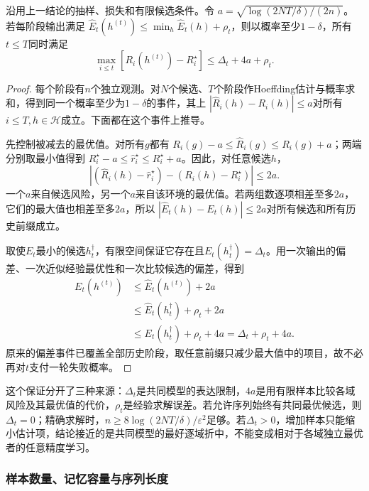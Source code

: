 \begin{theorem}[有限候选的逐历史分布保证]
\label{thm:continual-uniform-finite}
沿用上一结论的抽样、损失和有限候选条件。令
$a=\sqrt{\log(2NT/\delta)/(2n)}$。若每阶段输出满足
$\widehat E_t(h^{(t)})\leq\min_h\widehat E_t(h)+\rho_t$，则以概率至少$1-\delta$，所有$t\leq T$同时满足
\begin{equation}
 \max_{i\leq t}[R_i(h^{(t)})-R_i^\star]
 \leq\Delta_t+4a+\rho_t.
 \label{eq:continual-uniform-bound}
\end{equation}
\end{theorem}
\begin{proof}
每个阶段有$n$个独立观测。对$N$个候选、$T$个阶段作Hoeffding估计与概率求和，得到同一个概率至少为$1-\delta$的事件，其上
$|\widehat R_i(h)-R_i(h)|\leq a$对所有$i\leq T,h\in\mathcal H$成立。下面都在这个事件上推导。

先控制被减去的最优值。对所有$g$都有
$R_i(g)-a\leq\widehat R_i(g)\leq R_i(g)+a$；两端分别取最小值得到
$R_i^\star-a\leq\widehat r_i^\star\leq R_i^\star+a$。因此，对任意候选$h$，
\[
 \left|(\widehat R_i(h)-\widehat r_i^\star)
          -(R_i(h)-R_i^\star)\right|\leq2a.
\]
一个$a$来自候选风险，另一个$a$来自该环境的最优值。若两组数逐项相差至多$2a$，它们的最大值也相差至多$2a$，所以
$|\widehat E_t(h)-E_t(h)|\leq2a$对所有候选和所有历史前缀成立。

取使$E_t$最小的候选$h_t^\dagger$，有限空间保证它存在且$E_t(h_t^\dagger)=\Delta_t$。用一次输出的偏差、一次近似经验最优性和一次比较候选的偏差，得到
\begin{align*}
 E_t(h^{(t)})
 &\leq\widehat E_t(h^{(t)})+2a\\
 &\leq\widehat E_t(h_t^\dagger)+\rho_t+2a\\
 &\leq E_t(h_t^\dagger)+\rho_t+4a
 =\Delta_t+\rho_t+4a.
\end{align*}
原来的偏差事件已覆盖全部历史阶段，取任意前缀只减少最大值中的项目，故不必再对$t$支付一轮失败概率。
\end{proof}

这个保证分开了三种来源：$\Delta_t$是共同模型的表达限制，$4a$是用有限样本比较各域风险及其最优值的代价，$\rho_t$是经验求解误差。若允许序列始终有共同最优候选，则$\Delta_t=0$；精确求解时，$n\geq8\log(2NT/\delta)/\varepsilon^2$足够。若$\Delta_t>0$，增加样本只能缩小估计项，结论接近的是共同模型的最好逐域折中，不能变成相对于各域独立最优者的任意精度学习。

\subsubsection{样本数量、记忆容量与序列长度}

